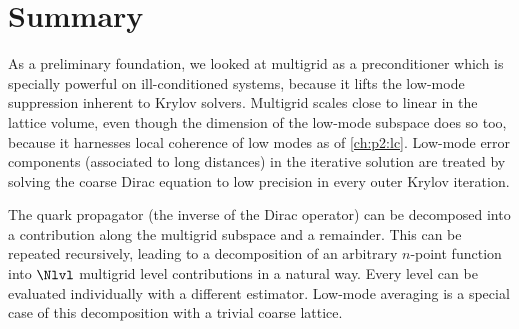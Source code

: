 



\section{Summary}
\label{sec:mg:summary}



As a preliminary foundation, we looked at multigrid as a preconditioner which is specially powerful on ill-conditioned systems, because it lifts the low-mode suppression inherent to Krylov solvers.
Multigrid scales close to linear in the lattice volume, even though the dimension of the low-mode subspace does so too, because it harnesses local coherence of low modes as of \cref{ch:p2:lc}.
Low-mode error components (associated to long distances) in the iterative solution are treated by solving the coarse Dirac equation to low precision in every outer Krylov iteration.

The quark propagator (the inverse of the Dirac operator) can be decomposed into a contribution along the multigrid subspace and a remainder.
This can be repeated recursively, leading to a decomposition of an arbitrary $n$-point function into $\Nlvl$ multigrid level contributions in a natural way.
Every level can be evaluated individually with a different estimator.
Low-mode averaging is a special case of this decomposition with a trivial coarse lattice.


